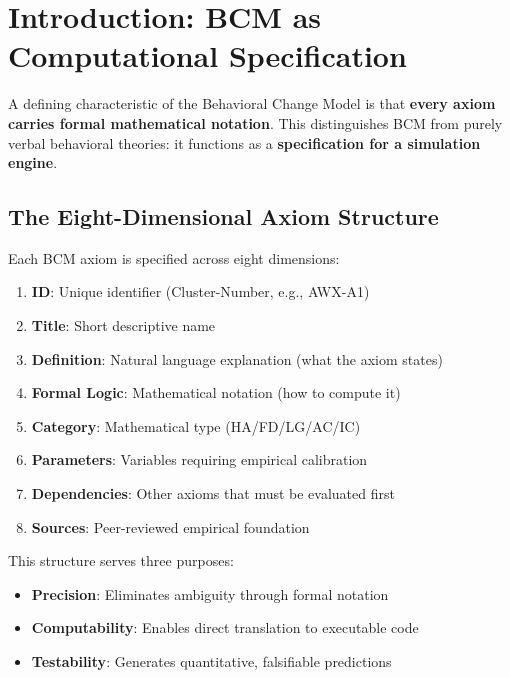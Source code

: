 \begin{abstract}
This appendix provides the complete formal specification of the \textbf{Awareness Axiom System (AWX)}---the mathematical foundation for Chapter 11. Each axiom is documented across eight dimensions: unique identifier, title, natural language definition, formal mathematical notation, mathematical category, calibration parameters, axiom dependencies, and empirical sources. This structure ensures that the Awareness module functions as a fully specified simulation engine rather than a verbal theory.
\end{abstract}

\section{Introduction: BCM as Computational Specification}

A defining characteristic of the Behavioral Change Model is that \textbf{every axiom carries formal mathematical notation}. This distinguishes BCM from purely verbal behavioral theories: it functions as a \textbf{specification for a simulation engine}.

\subsection{The Eight-Dimensional Axiom Structure}

Each BCM axiom is specified across eight dimensions:

\begin{enumerate}
    \item \textbf{ID}: Unique identifier (Cluster-Number, e.g., AWX-A1)
    \item \textbf{Title}: Short descriptive name
    \item \textbf{Definition}: Natural language explanation (what the axiom states)
    \item \textbf{Formal Logic}: Mathematical notation (how to compute it)
    \item \textbf{Category}: Mathematical type (HA/FD/LG/AC/IC)
    \item \textbf{Parameters}: Variables requiring empirical calibration
    \item \textbf{Dependencies}: Other axioms that must be evaluated first
    \item \textbf{Sources}: Peer-reviewed empirical foundation
\end{enumerate}

This structure serves three purposes:
\begin{itemize}
    \item \textbf{Precision}: Eliminates ambiguity through formal notation
    \item \textbf{Computability}: Enables direct translation to executable code
    \item \textbf{Testability}: Generates quantitative, falsifiable predictions
\end{itemize}


